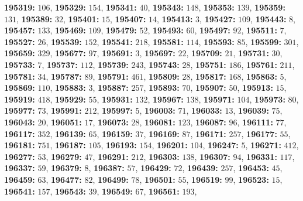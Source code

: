\textsf{\bfseries 195319:} $106$, \textsf{\bfseries 195329:} $154$, \textsf{\bfseries 195341:} $40$, \textsf{\bfseries 195343:} $148$, \textsf{\bfseries 195353:} $139$, \textsf{\bfseries 195359:} $131$, \textsf{\bfseries 195389:} $32$, \textsf{\bfseries 195401:} $15$, \textsf{\bfseries 195407:} $14$, \textsf{\bfseries 195413:} $3$, \textsf{\bfseries 195427:} $109$, \textsf{\bfseries 195443:} $8$, \textsf{\bfseries 195457:} $133$, \textsf{\bfseries 195469:} $109$, \textsf{\bfseries 195479:} $52$, \textsf{\bfseries 195493:} $60$, \textsf{\bfseries 195497:} $92$, \textsf{\bfseries 195511:} $7$, \textsf{\bfseries 195527:} $26$, \textsf{\bfseries 195539:} $152$, \textsf{\bfseries 195541:} $218$, \textsf{\bfseries 195581:} $114$, \textsf{\bfseries 195593:} $85$, \textsf{\bfseries 195599:} $301$, \textsf{\bfseries 195659:} $329$, \textsf{\bfseries 195677:} $97$, \textsf{\bfseries 195691:} $3$, \textsf{\bfseries 195697:} $22$, \textsf{\bfseries 195709:} $21$, \textsf{\bfseries 195731:} $30$, \textsf{\bfseries 195733:} $7$, \textsf{\bfseries 195737:} $112$, \textsf{\bfseries 195739:} $243$, \textsf{\bfseries 195743:} $28$, \textsf{\bfseries 195751:} $186$, \textsf{\bfseries 195761:} $211$, \textsf{\bfseries 195781:} $34$, \textsf{\bfseries 195787:} $89$, \textsf{\bfseries 195791:} $461$, \textsf{\bfseries 195809:} $28$, \textsf{\bfseries 195817:} $168$, \textsf{\bfseries 195863:} $5$, \textsf{\bfseries 195869:} $110$, \textsf{\bfseries 195883:} $3$, \textsf{\bfseries 195887:} $257$, \textsf{\bfseries 195893:} $70$, \textsf{\bfseries 195907:} $50$, \textsf{\bfseries 195913:} $15$, \textsf{\bfseries 195919:} $418$, \textsf{\bfseries 195929:} $55$, \textsf{\bfseries 195931:} $132$, \textsf{\bfseries 195967:} $138$, \textsf{\bfseries 195971:} $104$, \textsf{\bfseries 195973:} $80$, \textsf{\bfseries 195977:} $73$, \textsf{\bfseries 195991:} $212$, \textsf{\bfseries 195997:} $5$, \textsf{\bfseries 196003:} $71$, \textsf{\bfseries 196033:} $13$, \textsf{\bfseries 196039:} $75$, \textsf{\bfseries 196043:} $20$, \textsf{\bfseries 196051:} $17$, \textsf{\bfseries 196073:} $28$, \textsf{\bfseries 196081:} $123$, \textsf{\bfseries 196087:} $96$, \textsf{\bfseries 196111:} $77$, \textsf{\bfseries 196117:} $352$, \textsf{\bfseries 196139:} $65$, \textsf{\bfseries 196159:} $37$, \textsf{\bfseries 196169:} $87$, \textsf{\bfseries 196171:} $257$, \textsf{\bfseries 196177:} $55$, \textsf{\bfseries 196181:} $751$, \textsf{\bfseries 196187:} $105$, \textsf{\bfseries 196193:} $154$, \textsf{\bfseries 196201:} $104$, \textsf{\bfseries 196247:} $5$, \textsf{\bfseries 196271:} $412$, \textsf{\bfseries 196277:} $53$, \textsf{\bfseries 196279:} $47$, \textsf{\bfseries 196291:} $212$, \textsf{\bfseries 196303:} $138$, \textsf{\bfseries 196307:} $94$, \textsf{\bfseries 196331:} $117$, \textsf{\bfseries 196337:} $59$, \textsf{\bfseries 196379:} $8$, \textsf{\bfseries 196387:} $57$, \textsf{\bfseries 196429:} $72$, \textsf{\bfseries 196439:} $257$, \textsf{\bfseries 196453:} $45$, \textsf{\bfseries 196459:} $63$, \textsf{\bfseries 196477:} $82$, \textsf{\bfseries 196499:} $78$, \textsf{\bfseries 196501:} $55$, \textsf{\bfseries 196519:} $99$, \textsf{\bfseries 196523:} $15$, \textsf{\bfseries 196541:} $157$, \textsf{\bfseries 196543:} $39$, \textsf{\bfseries 196549:} $67$, \textsf{\bfseries 196561:} $193$, 
